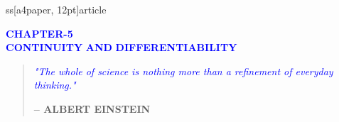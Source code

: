 ss[a4paper, 12pt]{article}
\usepackage{graphicx}
\usepackage[none]{hyphenat}
\usepackage{listings}
\usepackage[english]{babel}
\usepackage{caption}
\usepackage{hyperref}
\usepackage{booktabs}
\usepackage{array}
\usepackage{amsmath}
\usepackage{amssymb}
\usepackage{xcolor}
\usepackage{wrapfig}
\usepackage{fancyhdr}
\usepackage[a4paper, margin=1in]{geometry}


\lstset{
  frame=single,
    breaklines=true
    }

    \newcommand{\mydet}[1]{\ensuremath{\begin{vmatrix}#1\end{vmatrix}}}
    \providecommand{\brak}[1]{\ensuremath{\left(#1\right)}}
    \providecommand{\norm}[1]{\left\lVert#1\right\rVert}
    \newcommand{\solution}{\noindent \textbf{Solution: }}
    \newcommand{\myvec}[1]{\ensuremath{\begin{pmatrix}#1\end{pmatrix}}}
    \let\vec\mathbf

    

    \begin{center}
        \textbf{\textcolor{blue}{\large CHAPTER-5}} \\
	    \vspace{20pt}
	        \textbf{\textcolor{blue}{\huge CONTINUITY}}
		     \vspace{8pt}
		         \textbf{\textcolor{blue}{\huge AND}}
			     \vspace{8pt}
			         \textbf{\textcolor{blue}{\huge DIFFERENTIABILITY}}
				 \end{center}

				 \begin{center}
				     \begin{quote}
				             \textit{\textcolor{blue}{\large "The whole of science is nothing more than a refinement of everyday thinking."}} \\
					             \begin{flushright}
						                 \textbf{– ALBERT EINSTEIN}
								         \end{flushright}
									     \end{quote}
									     \end{center}

									     \pagestyle{fancy}
									     \fancyhf{} %
									     \fancyhead[C]{} %
									     \fancyhead[R]{\thepage} %
									     \renewcommand{\headrulewidth}{0pt} %
									     \renewcommand{\footrulewidth}{0pt} %

